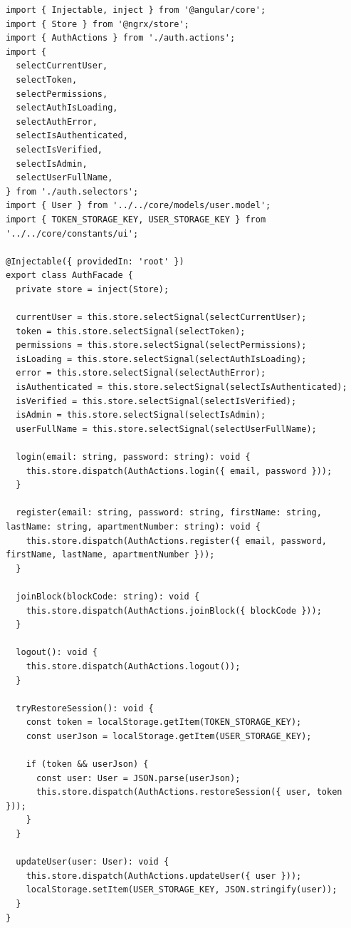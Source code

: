 \begin{lstlisting}[caption={Auth Facade isolating NgRx Store mechanics from Components}, label={lst:auth-facade}]
import { Injectable, inject } from '@angular/core';
import { Store } from '@ngrx/store';
import { AuthActions } from './auth.actions';
import {
  selectCurrentUser,
  selectToken,
  selectPermissions,
  selectAuthIsLoading,
  selectAuthError,
  selectIsAuthenticated,
  selectIsVerified,
  selectIsAdmin,
  selectUserFullName,
} from './auth.selectors';
import { User } from '../../core/models/user.model';
import { TOKEN_STORAGE_KEY, USER_STORAGE_KEY } from '../../core/constants/ui';

@Injectable({ providedIn: 'root' })
export class AuthFacade {
  private store = inject(Store);

  currentUser = this.store.selectSignal(selectCurrentUser);
  token = this.store.selectSignal(selectToken);
  permissions = this.store.selectSignal(selectPermissions);
  isLoading = this.store.selectSignal(selectAuthIsLoading);
  error = this.store.selectSignal(selectAuthError);
  isAuthenticated = this.store.selectSignal(selectIsAuthenticated);
  isVerified = this.store.selectSignal(selectIsVerified);
  isAdmin = this.store.selectSignal(selectIsAdmin);
  userFullName = this.store.selectSignal(selectUserFullName);

  login(email: string, password: string): void {
    this.store.dispatch(AuthActions.login({ email, password }));
  }

  register(email: string, password: string, firstName: string, lastName: string, apartmentNumber: string): void {
    this.store.dispatch(AuthActions.register({ email, password, firstName, lastName, apartmentNumber }));
  }

  joinBlock(blockCode: string): void {
    this.store.dispatch(AuthActions.joinBlock({ blockCode }));
  }

  logout(): void {
    this.store.dispatch(AuthActions.logout());
  }

  tryRestoreSession(): void {
    const token = localStorage.getItem(TOKEN_STORAGE_KEY);
    const userJson = localStorage.getItem(USER_STORAGE_KEY);

    if (token && userJson) {
      const user: User = JSON.parse(userJson);
      this.store.dispatch(AuthActions.restoreSession({ user, token }));
    }
  }

  updateUser(user: User): void {
    this.store.dispatch(AuthActions.updateUser({ user }));
    localStorage.setItem(USER_STORAGE_KEY, JSON.stringify(user));
  }
}
\end{lstlisting}

